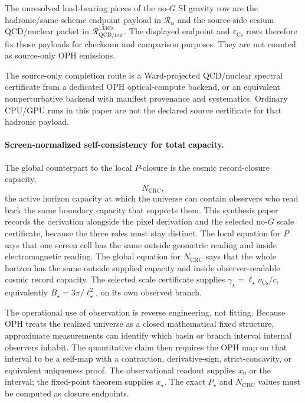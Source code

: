\begin{remark}\label{rem:hadronic-clock-boundary}
The unresolved load-bearing pieces of the no-\(G\) SI gravity row are the hadronic/same-scheme
endpoint payload in \(\mathcal R_\alpha\) and the source-side cesium QCD/nuclear packet in
\(\mathcal R_{\mathrm{QCD/nuc}}^{133\mathrm{Cs}}\).  The displayed endpoint and
\(\varepsilon_{\mathrm{Cs}}\) rows therefore fix those payloads for checksum and comparison
purposes.  They are not counted as source-only OPH emissions.

The source-only completion route is a Ward-projected QCD/nuclear spectral certificate from a
dedicated OPH optical-compute backend, or an equivalent nonperturbative backend with manifest
provenance and systematics.  Ordinary CPU/GPU runs in this paper are not the declared source
certificate for that hadronic payload.
\end{remark}

\paragraph{Screen-normalized self-consistency for total capacity.}\label{sec:n-closure}
The global counterpart to the local \(P\)-closure is the cosmic record-closure capacity,
\[
N_{\mathrm{CRC}},
\]
the active horizon capacity at which the universe can contain observers who read back the same
boundary capacity that supports them. This synthesis paper records the derivation alongside the
pixel derivation and the selected no-\(G\) scale certificate, because the three roles must stay
distinct. The local equation for \(P\) says that one screen cell has the same outside geometric
reading and inside electromagnetic reading. The global equation for \(N_{\mathrm{CRC}}\) says that
the whole horizon has the same outside supplied capacity and inside observer-readable cosmic record
capacity. The selected scale certificate supplies
\(\gamma_\star=\ell_\star\nu_{\mathrm{Cs}}/c\), equivalently
\(B_\star=3\pi/\ell_\star^2\), on its own observed branch.

The operational use of observation is reverse engineering, not fitting. Because OPH treats the
realized universe as a closed mathematical fixed structure, approximate measurements can identify
which basin or branch interval internal observers inhabit. The quantitative claim then requires the
OPH map on that interval to be a self-map with a contraction, derivative-sign, strict-concavity, or
equivalent uniqueness proof. The observational readout supplies \(x_0\) or the interval; the
fixed-point theorem supplies \(x_\star\). The exact \(P_\star\) and \(N_{\mathrm{CRC}}\) values must
be computed as closure endpoints.

